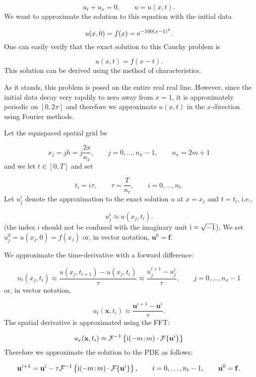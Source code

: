 \documentclass[12pt,a4paper]{article}
\begin{document}
\[
u_t + u_x = 0, \qquad u = u(x,t).
\]
We want to approximate the solution to this equation with the initial data

\[
u(x,0) = f(x) = {\rm e}^{-100(x-1)^2}.
\]
One can easily verify that the exact solution to this Cauchy problem is

\[
u(x,t) = f(x - t).
\]
This solution can be derived using the method of characteristics.     

As it stands, this problem is posed on the entire real real line.  However, since the initial data decay very rapdily to zero away from $x=1$, it is approximately periodic on $[0, 2\pi]$ and therefore we approximate $u(x,t)$ in the $x$-direction using Fourier methods. 

Let the equispaced spatial grid be

\[
x_j = jh = j \frac{2\pi}{n_x}, \qquad j = 0, \ldots, n_x-1, \qquad n_x = 2m+1
\]
and we let $t \in [0, T]$ and set

\[
t_i = i\tau, \qquad \tau = \frac{T}{n_t}, \qquad i = 0, \ldots, n_t.
\]
Let $u^{i}_j$ denote the approximation to the exact solution $u$ at $x=x_j$ and $t = t_i$, i.e.,

\[
u^{i}_j \approx u(x_j, t_i).
\]
(the index $i$ should not be confused with the imaginary unit ${\rm i} = \sqrt{-1}$).  We set $u^{0}_j = u(x_j,0) = f(x_j)$ or, in vector notation, $\mathbf{u}^{0} = \mathbf{f}$.

We approximate the time-derivative with a forward difference:

\[
u_t(x_j,t_i) \approx \frac{u(x_j,t_{i+1}) - u(x_j,t_{i})}{\tau} \approx \frac{u^{i+1}_j - u^{i}_j}{\tau}, \qquad j = 0, \ldots, n_x-1
\]
or, in vector notation,

\[
u_t(\mathbf{x},t_i) \approx \frac{\mathbf{u}^{i+1} - \mathbf{u}^{i}}{\tau}.
\]
The spatial derivative is approximated using the FFT:

\[
u_x(\mathbf{x},t_i) \approx \mathcal{F}^{-1}\left\lbrace {\rm i}(-m\!:\!m)\cdot\mathcal{F}\lbrace \mathbf{u}^{i} \rbrace\right\rbrace
\]
Therefore we approximate the solution to the PDE as follows:

\[
\mathbf{u}^{i+1} = \mathbf{u}^{i} - \tau \mathcal{F}^{-1}\left\lbrace {\rm i}(-m\!:\!m)\cdot\mathcal{F}\lbrace \mathbf{u}^{i} \rbrace\right\rbrace, \qquad i = 0, \ldots, n_t-1, \qquad \mathbf{u}^0 = \mathbf{f}.
\]
\end{document}
